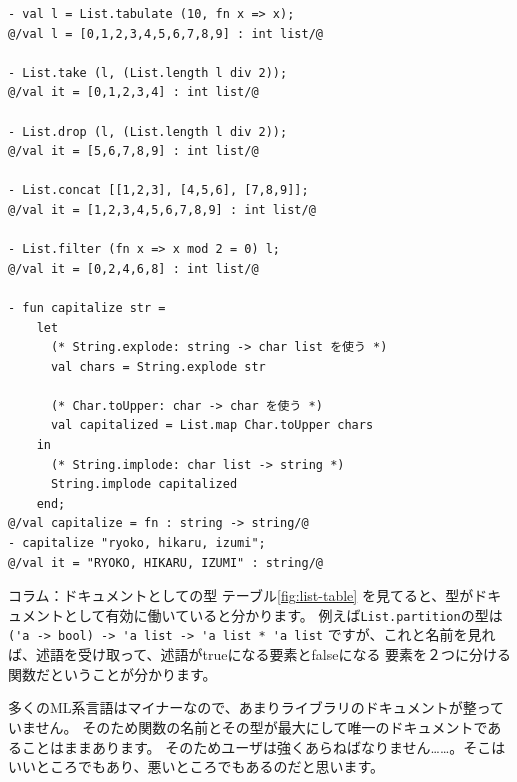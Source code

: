 \documentclass[11pt,a4paper]{article}
\begin{document}
\begin{lstlisting}[caption=Listモジュール,label=code:list-mod]
- val l = List.tabulate (10, fn x => x);
@/val l = [0,1,2,3,4,5,6,7,8,9] : int list/@

- List.take (l, (List.length l div 2));
@/val it = [0,1,2,3,4] : int list/@

- List.drop (l, (List.length l div 2));
@/val it = [5,6,7,8,9] : int list/@

- List.concat [[1,2,3], [4,5,6], [7,8,9]];
@/val it = [1,2,3,4,5,6,7,8,9] : int list/@

- List.filter (fn x => x mod 2 = 0) l;
@/val it = [0,2,4,6,8] : int list/@

- fun capitalize str =
    let
      (* String.explode: string -> char list を使う *)
      val chars = String.explode str

      (* Char.toUpper: char -> char を使う *)
      val capitalized = List.map Char.toUpper chars
    in
      (* String.implode: char list -> string *)
      String.implode capitalized
    end;
@/val capitalize = fn : string -> string/@
- capitalize "ryoko, hikaru, izumi";
@/val it = "RYOKO, HIKARU, IZUMI" : string/@
\end{lstlisting}

\begin{itembox}[l]{コラム：ドキュメントとしての型}
テーブル\ref{fig:list-table} を見てると、型がドキュメントとして有効に働いていると分かります。
例えば\lstinline{List.partition}の型は\lstinline{('a -> bool) -> 'a list -> 'a list * 'a list}
ですが、これと名前を見れば、述語を受け取って、述語がtrueになる要素とfalseになる
要素を２つに分ける関数だということが分かります。

多くのML系言語はマイナーなので、あまりライブラリのドキュメントが整っていません。
そのため関数の名前とその型が最大にして唯一のドキュメントであることはままあります。
そのためユーザは強くあらねばなりません……。そこはいいところでもあり、悪いところでもあるのだと思います。
\end{itembox}
\end{document}
